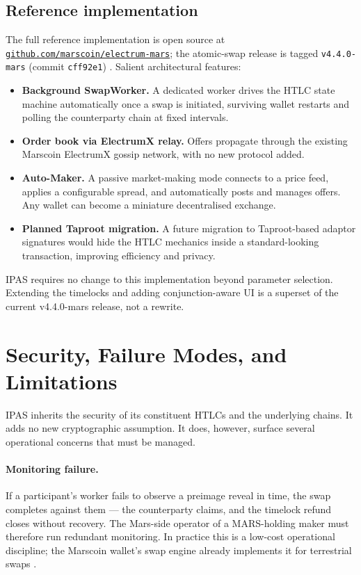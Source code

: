 \documentclass[11pt]{article}
\begin{document}
\subsection{Reference implementation}

The full reference implementation is open source at \href{https://github.com/marscoin/electrum-mars}{\texttt{github.com/marscoin/electrum-mars}}; the atomic-swap release is tagged \texttt{v4.4.0-mars} (commit \texttt{cff92e1}) \citep{marscoin2026electrum}. Salient architectural features:

\begin{itemize}
  \item \textbf{Background SwapWorker.} A dedicated worker drives the HTLC state machine automatically once a swap is initiated, surviving wallet restarts and polling the counterparty chain at fixed intervals.
  \item \textbf{Order book via ElectrumX relay.} Offers propagate through the existing Marscoin ElectrumX gossip network, with no new protocol added.
  \item \textbf{Auto-Maker.} A passive market-making mode connects to a price feed, applies a configurable spread, and automatically posts and manages offers. Any wallet can become a miniature decentralised exchange.
  \item \textbf{Planned Taproot migration.} A future migration to Taproot-based adaptor signatures would hide the HTLC mechanics inside a standard-looking transaction, improving efficiency and privacy.
\end{itemize}

IPAS requires no change to this implementation beyond parameter selection. Extending the timelocks and adding conjunction-aware UI is a superset of the current v4.4.0-mars release, not a rewrite.

\section{Security, Failure Modes, and Limitations}
\label{sec:security}

IPAS inherits the security of its constituent HTLCs and the underlying chains. It adds no new cryptographic assumption. It does, however, surface several operational concerns that must be managed.

\paragraph{Monitoring failure.} If a participant's worker fails to observe a preimage reveal in time, the swap completes against them --- the counterparty claims, and the timelock refund closes without recovery. The Mars-side operator of a MARS-holding maker must therefore run redundant monitoring. In practice this is a low-cost operational discipline; the Marscoin wallet's swap engine already implements it for terrestrial swaps \citep{marscoin2026ipas}.
\end{document}
